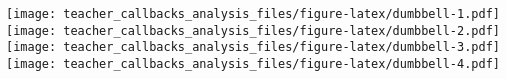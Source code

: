 \documentclass[
]{article}
\begin{document}
\texttt{[image: teacher\_callbacks\_analysis\_files/figure-latex/dumbbell-1.pdf]}
\texttt{[image: teacher\_callbacks\_analysis\_files/figure-latex/dumbbell-2.pdf]}
\texttt{[image: teacher\_callbacks\_analysis\_files/figure-latex/dumbbell-3.pdf]}
\texttt{[image: teacher\_callbacks\_analysis\_files/figure-latex/dumbbell-4.pdf]}
\end{document}
